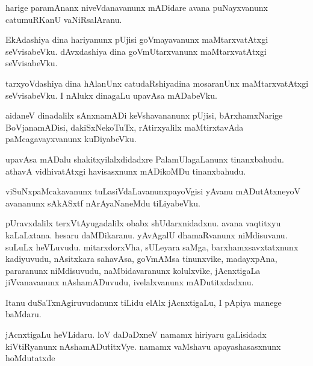 \begin{mng}
harige paramAnanx niveVdanavanunx mADidare avana puNayxvanunx catumuRKanU vaNiRsalAranu.
\end{mng}

\begin{mng}
EkAdashiya dina hariyanunx pUjisi goVmayavanunx maMtarxvatAtxgi seVvisabeVku. dAvxdashiya dina goVmUtarxvanunx maMtarxvatAtxgi seVvisabeVku.
\end{mng}

\begin{mng}
tarxyoVdashiya dina hAlanUnx catudaRshiyadina mosaranUnx maMtarxvatAtxgi seVvisabeVku. I nAlukx dinagaLu upavAsa mADabeVku.
\end{mng}

\begin{mng}
aidaneV dinadalilx sAnxnamADi keVshavananunx pUjisi, bArxhamxNarige BoVjanamADisi, dakiSxNekoTuTx, rAtirxyalilx maMtirxtavAda paMcagavayxvanunx kuDiyabeVku.
\end{mng}

\begin{mng}
upavAsa mADalu shakitxyilalxdidadxre PalamUlagaLanunx tinanxbahudu. athavA vidhivatAtxgi havisasxnunx mADikoMDu tinanxbahudu.
\end{mng}

\begin{mng}
viSuNxpaMcakavanunx tuLasiVdaLavanunxpayoVgisi yAvanu mADutAtxneyoV avananunx sAkASxtf nArAyaNaneMdu tiLiyabeVku.
\end{mng}

\begin{mng}
pUravxdalilx terxVtAyugadalilx obabx shUdarxnidadxnu. avana vaqtitxyu kaLaLxtana. hesaru daMDikaranu. yAvAgalU dhamaRvanunx niMdisuvanu. suLuLx heVLuvudu. mitarxdorxVha, sULeyara saMga, barxhamxsavxtatxnunx kadiyuvudu, nAsitxkara sahavAsa, goVmAMsa tinunxvike, madayxpAna, pararanunx niMdisuvudu, naMbidavaranunx kolulxvike, jAcnxtigaLa jiVvanavanunx nAshamADuvudu, ivelalxvanunx mADutitxdadxnu.
\end{mng}

\begin{mng}
Itanu duSaTxnAgiruvudanunx tiLidu elAlx jAcnxtigaLu, I pApiya manege baMdaru.
\end{mng}

\begin{mng}
jAcnxtigaLu heVLidaru. loV daDaDxneV namamx hiriyaru gaLisidadx kiVtiRyanunx nAshamADutitxVye. namamx vaMshavu apayashasasxnunx hoMdutatxde
\end{mng}

